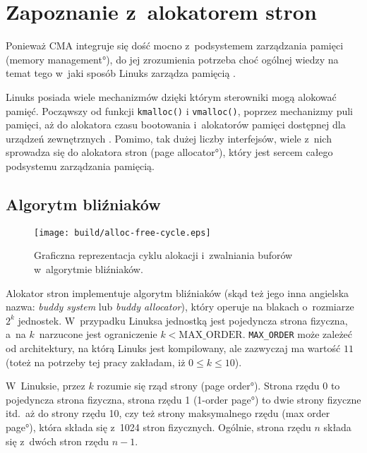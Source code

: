 \chapter{Zapoznanie z~alokatorem stron}

Ponieważ CMA integruje się dość mocno z~podsystemem zarządzania
pamięci (\ang{memory management}), do jej zrozumienia potrzeba
choć ogólnej wiedzy na temat tego w~jaki sposób Linuks zarządza
pamięcią .

Linuks posiada wiele mechanizmów dzięki którym sterowniki mogą
alokować pamięć.  Począwszy od funkcji \lstinline|kmalloc()|
i \lstinline|vmalloc()|, poprzez mechanizmy puli pamięci, aż do
alokatora czasu bootowania i~alokatorów pamięci dostępnej dla urządzeń
zewnętrznych \cite[rozdział 8]{bib:ldd3}.  Pomimo, tak dużej liczby
interfejsów, wiele z~nich sprowadza się do alokatora stron (\ang{page
  allocator}), który jest sercem całego podsystemu zarządzania
pamięcią.

\section{Algorytm bliźniaków}

\begin{wrapfigure}{o}[1.5cm]{0.3\textwidth}
\begin{center}
\texttt{[image: build/alloc-free-cycle.eps]}
\end{center}
\caption{Graficzna reprezentacja cyklu alokacji i~zwalniania buforów
  w~algorytmie bliźniaków.}
\end{wrapfigure}

Alokator stron implementuje algorytm bliźniaków (skąd też jego inna
angielska nazwa: {\it buddy system} lub {\it buddy allocator}), który
operuje na blakach o~rozmiarze $2^k$ jednostek.  W~przypadku Linuksa
jednostką jest pojedyncza strona fizyczna, a~na $k$~narzucone jest
ograniczenie $k < \mathrm{MAX\_ORDER}$.  \lstinline|MAX_ORDER| może
zależeć od architektury, na którą Linuks jest kompilowany, ale
zazwyczaj ma wartość $11$ (toteż na potrzeby tej pracy zakładam, iż $0
\le k \le 10$).

W~Linuksie, przez $k$ rozumie się rząd strony (\ang{page order}).
Strona rzędu 0 to pojedyncza strona fizyczna, strona rzędu 1
(\ang{1-order page}) to dwie strony fizyczne itd.\ aż do strony rzędu
10, czy też strony maksymalnego rzędu (\ang{max order page}), która
składa się z~1024 stron fizycznych.  Ogólnie, strona rzędu $n$ składa
się z~dwóch stron rzędu $n-1$.

